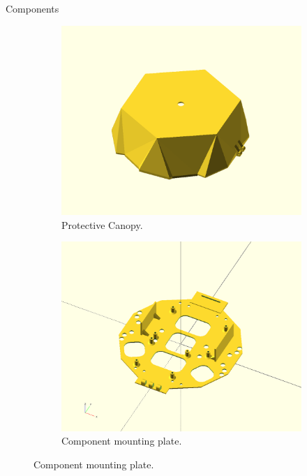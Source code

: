 \documentclass[final, 20pt]{beamer}
\newlength{\colwidth}
\begin{document}
\begin{frame}[t]
\begin{columns}[t]
\begin{column}{\colwidth}
\begin{alertblock}{Components}
    \begin{figure}
      \centering
      \begin{subfigure}[b]{0.33\textwidth}
        \includegraphics[width=\textwidth]{canopy.png}
        \caption*{Protective Canopy.}
      \end{subfigure}
      \hspace{1cm}
      \begin{subfigure}[b]{0.33\textwidth}
        \includegraphics[width=\textwidth]{component_mounting_plate.png}
        \caption*{Component mounting plate.}
      \end{subfigure}


\end{figure}
\end{alertblock}
\end{column}
\end{columns}
\end{frame}
\end{document}
